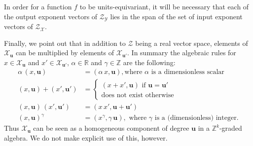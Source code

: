 \documentclass[twoside,11pt]{article}
\newcommand{\sectionname}{Section}
\newcommand{\secref}[1]{\sectionname~\ref{#1}}
\begin{document}

In order for a function $f$ to be units-equivariant, it will be necessary that each of the output exponent vectors of $\mathcal Z_{\mathcal Y}$ lies in the span of the set of input exponent vectors of $\mathcal Z_{\mathcal X}$.




Finally, we point out that in addition to $\mathcal Z$ being a real vector space, elements of $\mathcal X_{\mathbf u}$ can be multiplied by elements of $\mathcal X_{\mathbf u'}$. In summary the algebraic rules for $ x \in \mathcal X_{\mathbf u}$ and $ x' \in \mathcal X_{\mathbf u'}$, $\alpha \in \mathbb R$ and $\gamma \in \mathbb Z$ are the following:  
\begin{align}
 \alpha \, (x, \mathbf u) &=(\alpha\, x, \mathbf u), \text{where $\alpha$ is a dimensionless scalar}\\
    (x, \mathbf u) + (x', \mathbf u' ) &= \left \{
    \begin{array}{l}
    (x+x', \mathbf u) \text{ if } \mathbf u=\mathbf u' \\
    \text{does not exist otherwise}
    \end{array}
    \right. \\
    (x, \mathbf u)\, (x', \mathbf u' ) &=(x\, x', \mathbf u + \mathbf u') \\
    (x, \mathbf u)^{\gamma} &= (x^\gamma, \gamma\,\mathbf u ), \text{ where $\gamma$ is a (dimensionless)  integer}.
\end{align}
Thus $\mathcal X_\mathbf{u}$ can be seen as a homogeneous component of degree $\mathbf u$ in a $\mathbb Z^k$-graded algebra. We do not make explicit use of this, however.
\end{document}
